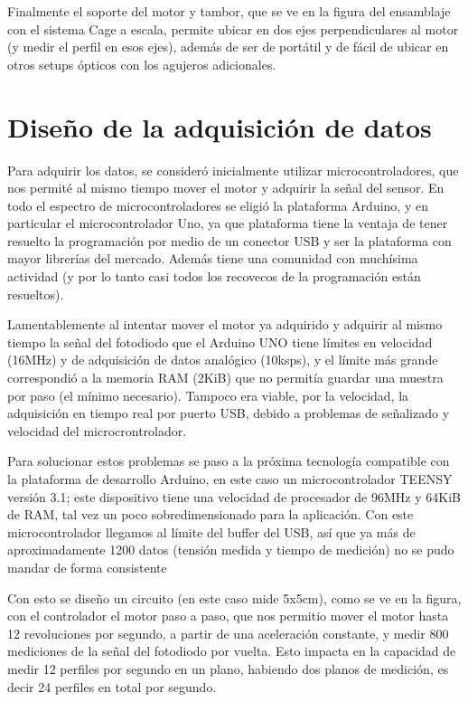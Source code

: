 \documentclass{article}
\begin{document}
Finalmente el soporte del motor y tambor, que se ve en la figura del ensamblaje con el sistema Cage a escala, permite ubicar en dos ejes perpendiculares al motor (y medir el perfil en esos ejes), además de ser de portátil y de fácil de ubicar en otros setups ópticos con los agujeros adicionales.


\section{Diseño de la adquisición de datos}
Para adquirir los datos, se consideró inicialmente utilizar microcontroladores, que nos permité al mismo tiempo mover el motor y adquirir la señal del sensor. En todo el espectro de microcontroladores se eligió la plataforma Arduino, y en particular el microcontrolador Uno, ya que plataforma tiene la ventaja de tener resuelto la programación por medio de un conector USB y ser la plataforma con mayor librerías del mercado. Además tiene una comunidad con muchísima actividad (y por lo tanto casi todos los recovecos de la programación están resueltos).

Lamentablemente al intentar mover el motor ya adquirido y adquirir al mismo tiempo la señal del fotodiodo que el Arduino UNO tiene límites en velocidad (16MHz) y de adquisición de datos analógico (10ksps), y el límite más grande correspondió a la memoria RAM (2KiB) que no permitía guardar una muestra por paso (el mínimo necesario).  Tampoco era viable, por la velocidad, la adquisición en tiempo real por puerto USB, debido a problemas de señalizado y velocidad del microcrontrolador. 

Para solucionar estos problemas se paso a la próxima tecnología compatible con la plataforma de desarrollo Arduino, en este caso un microcontrolador TEENSY versión 3.1; este dispositivo tiene una velocidad de procesador de 96MHz y 64KiB de RAM, tal vez un poco sobredimensionado para la aplicación. Con este microcontrolador llegamos al límite del buffer del USB, así que ya más de aproximadamente 1200 datos (tensión medida y tiempo de medición) no se pudo mandar de forma consistente

Con esto se diseño un circuito (en este caso mide 5x5cm), como se ve en la figura, con el controlador el motor paso a paso, que nos permitio mover el motor hasta 12 revoluciones por segundo, a partir de una aceleración constante, y medir 800 mediciones de la señal del fotodiodo por vuelta. Esto impacta en la capacidad de medir 12 perfiles por segundo en un plano, habiendo dos planos de medición, es decir 24 perfiles en total por segundo.
\end{document}
